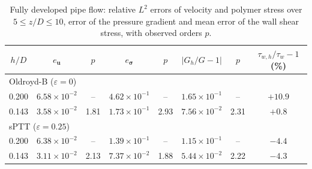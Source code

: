 \begin{table}
  \centering
  \begin{tabular}{cccccccc}
    \toprule
    $h/D$ & $e_{\boldsymbol{u}}$ & $p$ & $e_{\boldsymbol{\sigma}}$ & $p$
      & $|G_h/G-1|$ & $p$ & $\tau_{w,h}/\tau_w-1$ (\%) \\
    \midrule
    \multicolumn{8}{l}{Oldroyd-B ($\varepsilon=0$)} \\
    0.200 & $6.58{\times}10^{-2}$ & -- & $4.62{\times}10^{-1}$ & -- & $1.65{\times}10^{-1}$ & -- & $+10.9$ \\
    0.143 & $3.58{\times}10^{-2}$ & 1.81 & $1.73{\times}10^{-1}$ & 2.93 & $7.56{\times}10^{-2}$ & 2.31 & $+0.8$ \\
    \multicolumn{8}{l}{sPTT ($\varepsilon=0.25$)} \\
    0.200 & $6.38{\times}10^{-2}$ & -- & $1.39{\times}10^{-1}$ & -- & $1.15{\times}10^{-1}$ & -- & $-4.4$ \\
    0.143 & $3.11{\times}10^{-2}$ & 2.13 & $7.37{\times}10^{-2}$ & 1.88 & $5.44{\times}10^{-2}$ & 2.22 & $-4.3$ \\
    \bottomrule
  \end{tabular}
  \caption{Fully developed pipe flow: relative $L^2$ errors of velocity and
  polymer stress over $5\le z/D\le10$, error of the pressure gradient and mean
  error of the wall shear stress, with observed orders $p$.}
  \label{tab:sptt-pipe}
\end{table}
